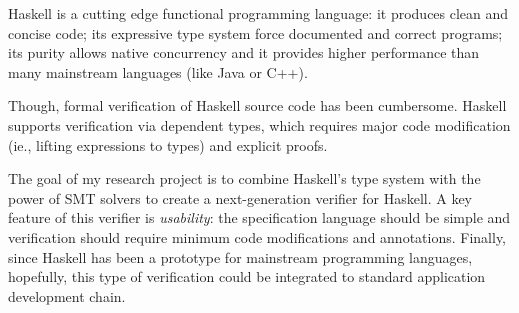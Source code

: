 Haskell is a cutting edge functional programming language:
it produces clean and concise code;
its expressive type system force documented and correct programs; 
its purity allows native concurrency and 
it provides higher performance than many mainstream languages (like Java or C++). 


Though, formal verification of Haskell source code has been cumbersome.
Haskell supports verification via dependent types, which requires  
major code modification (ie., lifting expressions to types)
and explicit proofs.
%

The goal of my research project is to combine Haskell's type system with 
the power of SMT solvers to 
create a next-generation verifier for Haskell.
%
A key feature of this verifier is  \textit{usability}:
the specification language should be simple and 
verification should require minimum code modifications and annotations. 
%
Finally, since Haskell has been a prototype for mainstream programming languages,
hopefully, this type of verification could be 
integrated to standard application development chain.
